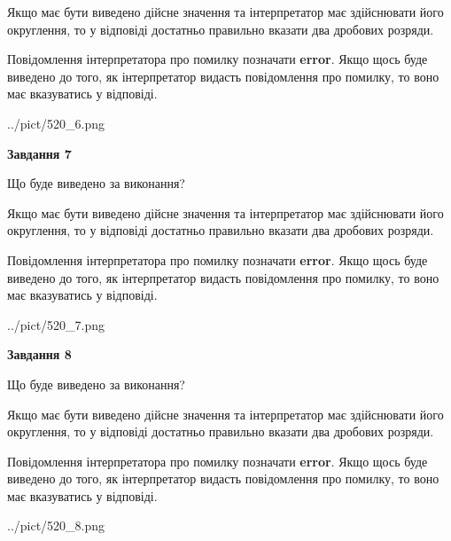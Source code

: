 \documentclass[12pt, ukrainian]{article}
\begin{document}
{\begin {Large}
Якщо має бути виведено дійсне значення та інтерпретатор має здійснювати його округлення, 
то у відповіді достатньо правильно вказати два дробових розряди.

Повідомлення інтерпретатора про помилку позначати \textbf{error}.
Якщо щось буде виведено до того, як інтерпретатор видасть повідомлення про помилку, 
то воно має вказуватись у відповіді. \par

\begin{center}
	{../pict/520_6.png}
\end{center}
\newpage

{\begin {center}\textbf{Завдання 7}\end {center}}\par
Що буде виведено за виконання? \par

Якщо має бути виведено дійсне значення та інтерпретатор має здійснювати його округлення, 
то у відповіді достатньо правильно вказати два дробових розряди.

Повідомлення інтерпретатора про помилку позначати \textbf{error}.
Якщо щось буде виведено до того, як інтерпретатор видасть повідомлення про помилку, 
то воно має вказуватись у відповіді. \par

\begin{center}
	{../pict/520_7.png}
\end{center}
\newpage

{\begin {center}\textbf{Завдання 8}\end {center}}\par
Що буде виведено за виконання? \par

Якщо має бути виведено дійсне значення та інтерпретатор має здійснювати його округлення, 
то у відповіді достатньо правильно вказати два дробових розряди.

Повідомлення інтерпретатора про помилку позначати \textbf{error}.
Якщо щось буде виведено до того, як інтерпретатор видасть повідомлення про помилку, 
то воно має вказуватись у відповіді. \par

\begin{center}
	{../pict/520_8.png}
\end{center}
\newpage


\end{Large}}
\end{document}
